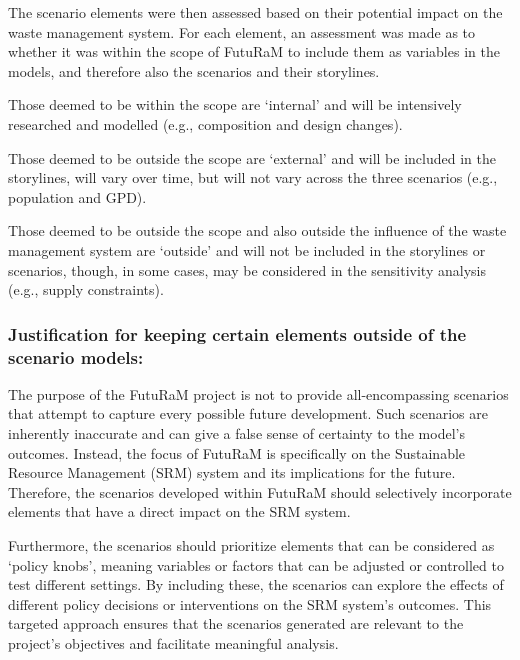 \begin{enumerate}
        The scenario elements were then assessed based on their potential impact on the waste management system. For each element, an assessment was made as to whether it was within the scope of FutuRaM to include them as variables in the models, and therefore also the scenarios and their storylines.

        \vspace{\baselineskip}

        Those deemed to be within the scope are `internal' and will be intensively researched and modelled (e.g., composition and design changes).

        \vspace{\baselineskip}

        Those deemed to be outside the scope are `external' and will be included in the storylines, will vary over time, but will not vary across the three scenarios (e.g., population and GPD).

        \vspace{\baselineskip}

        Those deemed to be outside the scope and also outside the influence of the waste management system are `outside' and will not be included in the storylines or scenarios, though, in some cases, may be considered in the sensitivity analysis (e.g., supply constraints).


        \subsubsection{Justification for keeping certain elements outside of the scenario models:}

        The purpose of the FutuRaM project is not to provide all-encompassing scenarios that attempt to capture every possible future development. Such scenarios are inherently inaccurate and can give a false sense of certainty to the model's outcomes. Instead, the focus of FutuRaM is specifically on the Sustainable Resource Management (SRM) system and its implications for the future. Therefore, the scenarios developed within FutuRaM should selectively incorporate elements that have a direct impact on the SRM system.
        \vspace{\baselineskip}

        Furthermore, the scenarios should prioritize elements that can be considered as `policy knobs', meaning variables or factors that can be adjusted or controlled to test different settings. By including these, the scenarios can explore the effects of different policy decisions or interventions on the SRM system's outcomes. This targeted approach ensures that the scenarios generated are relevant to the project's objectives and facilitate meaningful analysis.
        \vspace{\baselineskip}


\end{enumerate}
